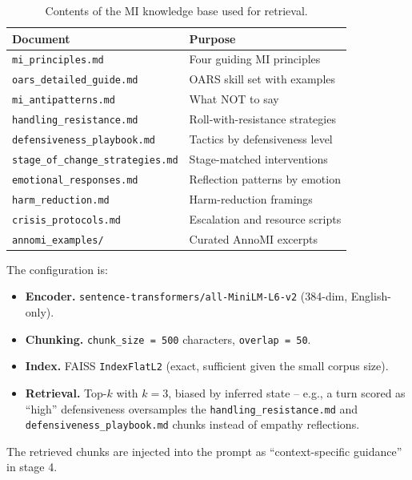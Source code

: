 \begin{table}[h]
\centering
\caption{Contents of the MI knowledge base used for retrieval.}
\label{tab:kb-contents}
\begin{tabular}{ll}
\toprule
\textbf{Document} & \textbf{Purpose} \\
\midrule
\texttt{mi\_principles.md}              & Four guiding MI principles \\
\texttt{oars\_detailed\_guide.md}       & OARS skill set with examples \\
\texttt{mi\_antipatterns.md}            & What NOT to say \\
\texttt{handling\_resistance.md}        & Roll-with-resistance strategies \\
\texttt{defensiveness\_playbook.md}     & Tactics by defensiveness level \\
\texttt{stage\_of\_change\_strategies.md} & Stage-matched interventions \\
\texttt{emotional\_responses.md}        & Reflection patterns by emotion \\
\texttt{harm\_reduction.md}             & Harm-reduction framings \\
\texttt{crisis\_protocols.md}           & Escalation and resource scripts \\
\texttt{annomi\_examples/}              & Curated AnnoMI excerpts \\
\bottomrule
\end{tabular}
\end{table}

The configuration is:
\begin{itemize}
    \item \textbf{Encoder.} \texttt{sentence-transformers/all-MiniLM-L6-v2}
    (384-dim, English-only).
    \item \textbf{Chunking.} \texttt{chunk\_size = 500} characters,
    \texttt{overlap = 50}.
    \item \textbf{Index.} FAISS \texttt{IndexFlatL2} (exact, sufficient given
    the small corpus size).
    \item \textbf{Retrieval.} Top-$k$ with $k=3$, biased by inferred state --
    e.g., a turn scored as ``high'' defensiveness oversamples the
    \texttt{handling\_resistance.md} and \texttt{defensiveness\_playbook.md}
    chunks instead of empathy reflections.
\end{itemize}

The retrieved chunks are injected into the prompt as ``context-specific
guidance'' in stage 4.

